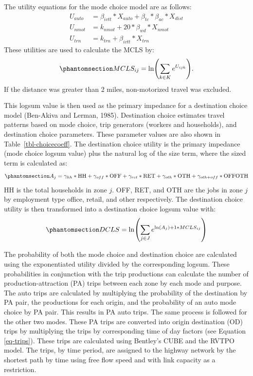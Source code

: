 \documentclass[
  futuretransp,
  submit,
  moreauthors,
]{Definitions/mdpi}
\begin{document}
The utility equations for the mode choice model are as follows: \[
\begin{aligned}
U_{auto} &= \beta_{ivtt} * X_{auto} + \beta_{tc} * \beta_{ac} * X_{dist}\\
U_{nmot} &= k_{nmot} + 20 * \beta_{wd}*X_{nmot}\\
U_{trn} &= k_{trn} + \beta_{ivtt} * X_{trn}
\end{aligned}
\] These utilities are used to calculate the MCLS by:
\begin{equation}\phantomsection\label{eq-mcls}{
MCLS_{ij} = \ln\left(\sum_{k \in K} e^{U_{ijk}}\right).
}\end{equation} If the distance was greater than 2 miles, non-motorized
travel was excluded.

This logsum value is then used as the primary impedance for a
destination choice model (Ben-Akiva and Lerman, 1985). Destination
choice estimates travel patterns based on mode choice, trip generators
(workers and households), and destination choice parameters. These
parameter values are also shown in Table~\ref{tbl-choicecoeff}. The
destination choice utility is the primary impedance (mode choice logsum
value) plus the natural log of the size term, where the sized term is
calculated as: \begin{equation}\phantomsection\label{eq-dcsizeterm}{
A_j = \gamma_{hh} * \mathrm{HH} + \gamma_{off} * \mathrm{OFF} + \gamma_{ret} * \mathrm{RET} + \gamma_{oth} * \mathrm{OTH} + \\ \gamma_{oth+off} * \mathrm{OFFOTH}
}\end{equation} HH is the total households in zone \(j\). OFF, RET, and
OTH are the jobs in zone \(j\) by employment type office, retail, and
other respectively. The destination choice utility is then transformed
into a destination choice logsum value with:
\begin{equation}\phantomsection\label{eq-dcls}{
DCLS = \ln \left(\sum_{j \in J} e^{\ln(A_j) + 1* MCLS_{ij}}\right)
}\end{equation}

The probability of both the mode choice and destination choice are
calculated using the exponentiated utility divided by the corresponding
logsum. These probabilities in conjunction with the trip productions can
calculate the number of production-attraction (PA) trips between each
zone by each mode and purpose. The auto trips are calculated by
multiplying the probability of the destination by PA pair, the
productions for each origin, and the probability of an auto mode choice
by PA pair. This results in PA auto trips. The same process is followed
for the other two modes. These PA trips are converted into origin
destination (OD) trips by multiplying the trips by corresponding time of
day factors (see Equation \ref{eq-trips}). These trips are calculated using Bentley's
CUBE and the RVTPO model. The trips, by time period, are assigned to the
highway network by the shortest path by time using free flow speed and
with link capacity as a restriction.
\end{document}
